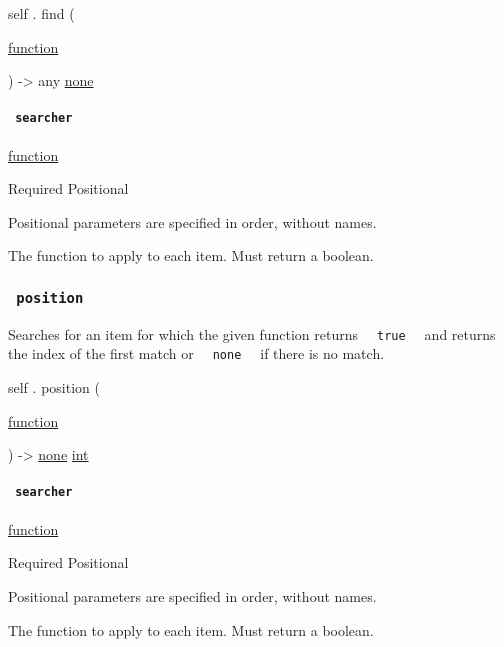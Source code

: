self { . } { find } (

{ \href{/docs/reference/foundations/function/}{function} }

) -\textgreater{} { any } \href{/docs/reference/foundations/none/}{none}

\paragraph{\texorpdfstring{\texttt{\ searcher\ }}{ searcher }}\label{definitions-find-searcher}

\href{/docs/reference/foundations/function/}{function}

{Required} {{ Positional }}

\label{definitions-find-searcher-positional-tooltip}
Positional parameters are specified in order, without names.

The function to apply to each item. Must return a boolean.

\subsubsection{\texorpdfstring{\texttt{\ position\ }}{ position }}\label{definitions-position}

Searches for an item for which the given function returns
\texttt{\ }{\texttt{\ true\ }}\texttt{\ } and returns the index of the
first match or \texttt{\ }{\texttt{\ none\ }}\texttt{\ } if there is no
match.

self { . } { position } (

{ \href{/docs/reference/foundations/function/}{function} }

) -\textgreater{} \href{/docs/reference/foundations/none/}{none}
\href{/docs/reference/foundations/int/}{int}

\paragraph{\texorpdfstring{\texttt{\ searcher\ }}{ searcher }}\label{definitions-position-searcher}

\href{/docs/reference/foundations/function/}{function}

{Required} {{ Positional }}

\label{definitions-position-searcher-positional-tooltip}
Positional parameters are specified in order, without names.

The function to apply to each item. Must return a boolean.

